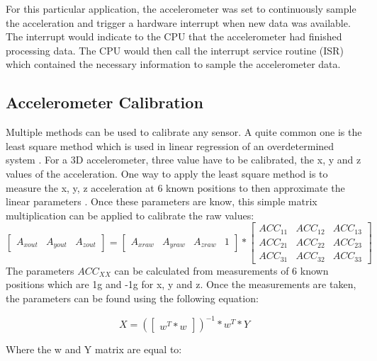 \documentclass[12pt]{article}
\begin{document}
For this particular application, the accelerometer was set to continuously sample the acceleration and trigger a hardware interrupt when new data was available. The interrupt would indicate to the CPU that the accelerometer had finished processing data. The CPU would then call the interrupt service routine (ISR) which contained the necessary information to sample the accelerometer data.

\subsection{Accelerometer Calibration}

Multiple methods can be used to calibrate any sensor. A quite common one is the least square method which is used in linear regression of an overdetermined system \cite{bjorck1996numerical}. For a 3D accelerometer, three value have to be calibrated, the x, y and z values of the acceleration. One way to apply the least square method is to measure the x, y, z acceleration at 6 known positions to then approximate the linear parameters \cite{AN3182ApplicationNote}. Once these parameters are know, this simple matrix multiplication can be applied to calibrate the raw values:
\begin{equation} \label{cal_eq:1}
 \begin{bmatrix}A_{xout} & A_{yout} & A_{zout}\end{bmatrix} = \begin{bmatrix}A_{xraw} & A_{yraw} & A_{zraw} & 1\end{bmatrix} *
\begin{bmatrix}ACC_{11} & ACC_{12} & ACC_{13} \\
ACC_{21} & ACC_{22} & ACC_{23} \\
ACC_{31} & ACC_{32} & ACC_{33} \end{bmatrix}
\end{equation} 
The parameters $ ACC_{XX} $ can be calculated from measurements of 6 known positions which are 1g and -1g for x, y and z. Once the measurements are taken, the parameters can be found using the following equation:

\begin{equation} \label{cal_eq:2}
 X = (\begin{bmatrix} w^{T}*w \end{bmatrix})^{-1}*w^{T} * Y 
 \end{equation}

Where the w and Y matrix are equal to: 
\end{document}
